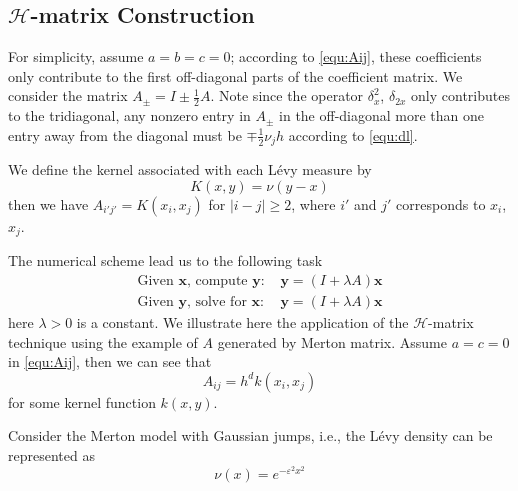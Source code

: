 \documentclass[10pt,a4paper]{article}
\newcommand{\bx}[0]{\mathbf{x}}
\theoremstyle{definition}
\newcommand{\by}[0]{\mathbf{y}}
\begin{document}
 \subsection{$\mathcal{H}$-matrix Construction} 
 
 For simplicity, assume $a=b=c=0$; according to \cref{equ:Aij}, these coefficients only contribute to the first off-diagonal parts of the coefficient matrix. We consider the matrix $A_\pm = I \pm \frac{1}{2}A$. Note since the operator $\delta_x^2$, $\delta_{2x}$ only contributes to the tridiagonal, any nonzero entry in $A_\pm$ in the off-diagonal more than one entry away from the diagonal must be $\mp\frac{1}{2}\nu_jh$ according to \cref{equ:dl}. 

We define the kernel associated with each L\'evy measure by
\begin{equation}
	K(x,y) = \nu(y-x)
\end{equation}
then we have $A_{i'j'}=K(x_{i},x_{j})$ for $|i-j|\geq 2$, where $i'$ and $j'$ corresponds to $x_{i}$, $x_j$.



 The numerical scheme lead us to the following task
 \begin{align}
 	\mbox{Given $\bx$, compute $\by$: }&\by = (I+\lambda A)\bx\\
 	\mbox{Given $\by$, solve for $\bx$: }&\by = (I+\lambda A)\bx
 \end{align}
 here $\lambda>0$ is a constant. We illustrate here the application of the $\mathcal{H}$-matrix technique using the example of $A$ generated by Merton matrix. Assume $a=c=0$ in \cref{equ:Aij}, then we can see that
 \begin{equation}
 	A_{ij} = h^d k(x_i, x_j)
 \end{equation}
 for some kernel function $k(x,y)$. 
 
Consider the Merton model with Gaussian jumps, i.e., the L\'evy density can be represented as
\begin{equation}
	\nu(x) = e^{-\varepsilon^2 x^2}
\end{equation}
\end{document}
